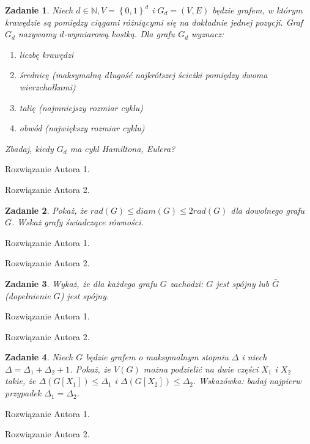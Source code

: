 \documentclass{mwart}
\newcommand{\N}{\mathbb{N}}
\newtheorem{zad}{Zadanie}[section]
\begin{document}
\begin{zad}
    Niech $d \in \N, V = \left\{0,1\right\}^d$ i $G_d=(V,E)$ będzie grafem, w którym krawędzie
    są pomiędzy ciągami różniącymi się na dokładnie jednej pozycji. Graf $G_d$ nazywamy
    $d$-wymiarową kostką. Dla grafu $G_d$ wyznacz:
    \begin{enumerate}
        \item liczbę krawędzi
        \item średnicę (maksymalną długość najkrótszej ścieżki pomiędzy dwoma wierzchołkami)
        \item talię (najmniejszy rozmiar cyklu)
        \item obwód (największy rozmiar cyklu)
    \end{enumerate}
    Zbadaj, kiedy $G_d$ ma cykl Hamiltona, Eulera?
\end{zad}
\begin{mdframed}
    Rozwiązanie Autora 1.
\end{mdframed}
\begin{mdframed}
    Rozwiązanie Autora 2.
\end{mdframed}


\begin{zad}
    Pokaż, że $rad(G) \leq diam(G) \leq 2 rad(G)$ dla dowolnego grafu $G$. Wskaż grafy świadczące równości.
\end{zad}
\begin{mdframed}
    Rozwiązanie Autora 1.
\end{mdframed}
\begin{mdframed}
    Rozwiązanie Autora 2.
\end{mdframed}



\begin{zad}
    Wykaż, że dla każdego grafu $G$ zachodzi: $G$ jest spójny lub $\bar{G}$ (dopełnienie $G$) jest spójny.
\end{zad}
\begin{mdframed}
    Rozwiązanie Autora 1.
\end{mdframed}
\begin{mdframed}
    Rozwiązanie Autora 2.
\end{mdframed}


\begin{zad}
    Niech $G$ będzie grafem o maksymalnym stopniu $\Delta$ i niech $\Delta = \Delta_1 + \Delta_2 +1$.
    Pokaż, że $V(G)$ można podzielić na dwie części $X_1$ i $X_2$ takie, że $\Delta (G[X_1]) \leq \Delta_1$ i $\Delta (G[X_2]) \leq \Delta_2$.
    Wskazówka: badaj najpierw przypadek $\Delta_1 = \Delta_2$.
\end{zad}
\begin{mdframed}
    Rozwiązanie Autora 1.
\end{mdframed}
\begin{mdframed}
    Rozwiązanie Autora 2.
\end{mdframed}
\end{document}
